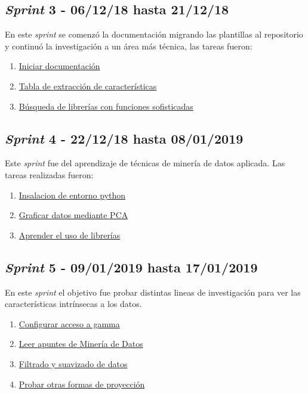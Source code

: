 \subsection{\textit{Sprint} 3 - 06/12/18 hasta 21/12/18}
En este \textit{sprint} se comenzó la documentación migrando las plantillas al repositorio y continuó la investigación a un área más técnica, las tareas fueron:

\begin{enumerate}\addtocounter{enumi}{6}
	\item \href{https://github.com/joselucross/TFG-SmartBeds/issues/7}{Iniciar documentación}
	\item \href{https://github.com/joselucross/TFG-SmartBeds/issues/8}{Tabla de extracción de características}
	\item \href{https://github.com/joselucross/TFG-SmartBeds/issues/9}{ Búsqueda de librerías con funciones sofisticadas}
	
\end{enumerate}

\subsection{\textit{Sprint} 4 - 22/12/18 hasta 08/01/2019}
Este \textit{sprint} fue del aprendizaje de técnicas de minería de datos aplicada. Las tareas realizadas fueron:

\begin{enumerate}\addtocounter{enumi}{9}
	\item \href{https://github.com/joselucross/TFG-SmartBeds/issues/10}{ Insalacion de entorno python}
	\item \href{https://github.com/joselucross/TFG-SmartBeds/issues/11}{ Graficar datos mediante PCA}
	\item \href{https://github.com/joselucross/TFG-SmartBeds/issues/12}{ Aprender el uso de librerías}
\end{enumerate}

\subsection{\textit{Sprint} 5 - 09/01/2019 hasta 17/01/2019}
En este \textit{sprint} el objetivo fue probar distintas lineas de investigación para ver las características intrínsecas a los datos.

\begin{enumerate}\addtocounter{enumi}{12}
	\item \href{https://github.com/joselucross/TFG-SmartBeds/issues/13}{ Configurar acceso a gamma}
	\item \href{https://github.com/joselucross/TFG-SmartBeds/issues/14}{ Leer apuntes de Minería de Datos}
	\item \href{https://github.com/joselucross/TFG-SmartBeds/issues/15}{ Filtrado y suavizado de datos}
	\item \href{https://github.com/joselucross/TFG-SmartBeds/issues/16}{ Probar otras formas de proyección}
\end{enumerate}	

